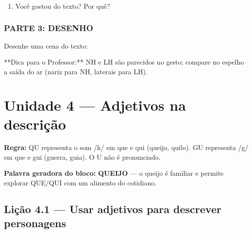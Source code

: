 \begin{exercicio}
\begin{enumerate}
  \item Você gostou do texto? Por quê?
  \begin{center}
  \underline{\hspace{12cm}}
  \end{center}

\end{enumerate}

\subsection*{PARTE 3: DESENHO}

Desenhe uma cena do texto:

\begin{center}
\end{center}

\end{exercicio}

\begin{dica}
**Dica para o Professor:** NH e LH são parecidos no gesto; compare no espelho a saída do ar (nariz para NH, laterais para LH).
\end{dica}



\chapter{Unidade 4 --- Adjetivos na descrição}


\textbf{Regra:} QU representa o som /k/ em que e qui (queijo, quilo). GU representa /g/ em que e gui (guerra, guia). O U não é pronunciado.

\textbf{Palavra geradora do bloco:} \textbf{QUEIJO} --- o queijo é familiar e permite explorar QUE/QUI com um alimento do cotidiano.

\section{Lição 4.1 --- Usar adjetivos para descrever personagens}

